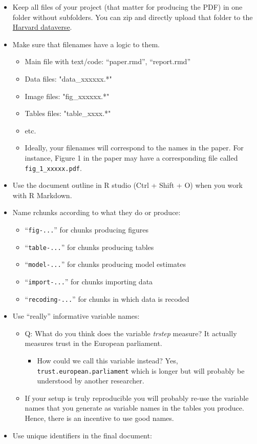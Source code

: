 \documentclass[
  12pt,
]{article}
\providecommand{\tightlist}{%
  \setlength{\itemsep}{0pt}\setlength{\parskip}{0pt}}
\begin{document}
\begin{itemize}
\tightlist
\item
  Keep all files of your project (that matter for producing the PDF) in one folder without subfolders. You can zip and directly upload that folder to the \href{https://dataverse.harvard.edu/}{Harvard dataverse}.
\item
  Make sure that filenames have a logic to them.

  \begin{itemize}
  \tightlist
  \item
    Main file with text/code: ``paper.rmd'', ``report.rmd''
  \item
    Data files: "data\_xxxxxx.*"
  \item
    Image files: "fig\_xxxxxx.*"
  \item
    Tables files: "table\_xxxx.*"
  \item
    etc.
  \item
    Ideally, your filenames will correspond to the names in the paper. For instance, Figure 1 in the paper may have a corresponding file called \texttt{fig\_1\_xxxxx.pdf}.
  \end{itemize}
\item
  Use the document outline in R studio (Ctrl + Shift + O) when you work with R Markdown.
\item
  Name rchunks according to what they do or produce:

  \begin{itemize}
  \tightlist
  \item
    ``\texttt{fig-...}'' for chunks producing figures
  \item
    ``\texttt{table-...}'' for chunks producing tables
  \item
    ``\texttt{model-...}'' for chunks producing model estimates
  \item
    ``\texttt{import-...}'' for chunks importing data
  \item
    ``\texttt{recoding-...}'' for chunks in which data is recoded
  \end{itemize}
\item
  Use ``really'' informative variable names:

  \begin{itemize}
  \tightlist
  \item
    Q: What do you think does the variable \emph{trstep} measure? It actually measures trust in the European parliament.

    \begin{itemize}
    \tightlist
    \item
      How could we call this variable instead? Yes, \texttt{trust.european.parliament} which is longer but will probably be understood by another researcher.
    \end{itemize}
  \item
    If your setup is truly reproducible you will probably re-use the variable names that you generate as variable names in the tables you produce. Hence, there is an incentive to use good names.
  \end{itemize}
\item
  Use unique identifiers in the final document:


\end{itemize}
\end{document}
